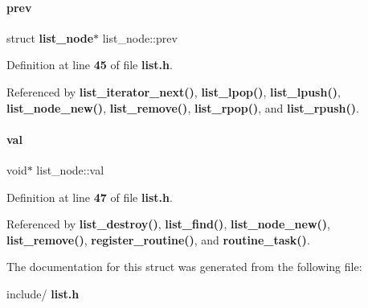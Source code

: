 \paragraph{prev}
{\footnotesize\ttfamily struct \textbf{ list\+\_\+node}$\ast$ list\+\_\+node\+::prev}



Definition at line \textbf{ 45} of file \textbf{ list.\+h}.



Referenced by \textbf{ list\+\_\+iterator\+\_\+next()}, \textbf{ list\+\_\+lpop()}, \textbf{ list\+\_\+lpush()}, \textbf{ list\+\_\+node\+\_\+new()}, \textbf{ list\+\_\+remove()}, \textbf{ list\+\_\+rpop()}, and \textbf{ list\+\_\+rpush()}.

\mbox{\label{a00167_a129de89b4c110fa54377ef16ab128ce0}} 
\paragraph{val}
{\footnotesize\ttfamily void$\ast$ list\+\_\+node\+::val}



Definition at line \textbf{ 47} of file \textbf{ list.\+h}.



Referenced by \textbf{ list\+\_\+destroy()}, \textbf{ list\+\_\+find()}, \textbf{ list\+\_\+node\+\_\+new()}, \textbf{ list\+\_\+remove()}, \textbf{ register\+\_\+routine()}, and \textbf{ routine\+\_\+task()}.



The documentation for this struct was generated from the following file\+:\begin{DoxyCompactItemize}
\item 
include/\textbf{ list.\+h}\end{DoxyCompactItemize}
